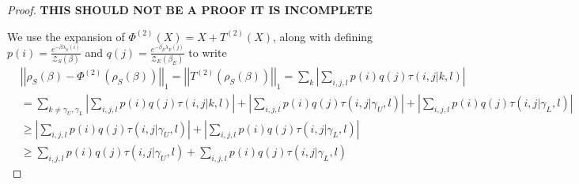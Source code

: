\documentclass{article}
\newcommand{\abs}[1]{\left| #1 \right|}
\newcommand{\norm}[1]{\left| \left| #1 \right| \right|}
\newcommand{\partfun}{\mathcal{Z}}
\begin{document}
\begin{proof}
\textbf{THIS SHOULD NOT BE A PROOF IT IS INCOMPLETE}


     We use the expansion of $\Phi^{(2)}(X) = X + T^{(2)} (X)$, along with defining $p(i) = \frac{e^{-\beta \lambda_S(i)}}{\partfun_S(\beta)}$ and $q(j) = \frac{e^{-\beta_E \lambda_E(j)}}{\partfun_E(\beta_E)}$ to write
     \begin{align}
        &\norm{\rho_S(\beta) - \Phi^{(2)} (\rho_S(\beta))}_1 = \norm{T^{(2)}(\rho_S(\beta))}_1 = \sum_k \abs{\sum_{i,j,l} p(i) q(j) \tau(i,j | k,l)} \\
        &= \sum_{k \neq \gamma_U, \gamma_L} \abs{\sum_{i,j,l} p(i) q(j) \tau(i,j|k,l)} + \abs{\sum_{i,j,l} p(i) q(j) \tau(i,j | \gamma_U, l)} + \abs{\sum_{i,j,l} p(i) q(j) \tau(i,j | \gamma_L, l)} \\
        &\geq \abs{\sum_{i,j,l} p(i) q(j) \tau(i,j | \gamma_U, l)} + \abs{\sum_{i,j,l} p(i) q(j) \tau(i,j | \gamma_L, l)} \\
        &\geq \sum_{i,j,l} p(i) q(j) \tau(i,j | \gamma_U, l) + \sum_{i,j,l} p(i) q(j) \tau(i,j | \gamma_L, l)
     \end{align}
     

\end{proof}
\end{document}
